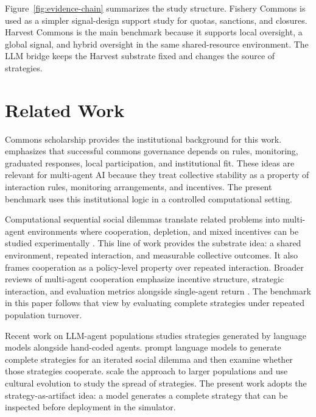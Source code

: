 \documentclass[11pt]{article}
\begin{document}
Figure~\ref{fig:evidence-chain} summarizes the study structure. Fishery Commons is used as a simpler signal-design support study for quotas, sanctions, and closures. Harvest Commons is the main benchmark because it supports local oversight, a global signal, and hybrid oversight in the same shared-resource environment. The LLM bridge keeps the Harvest substrate fixed and changes the source of strategies.

\section{Related Work}

Commons scholarship provides the institutional background for this work. \citet{ostrom1990governing} emphasizes that successful commons governance depends on rules, monitoring, graduated responses, local participation, and institutional fit. These ideas are relevant for multi-agent AI because they treat collective stability as a property of interaction rules, monitoring arrangements, and incentives. The present benchmark uses this institutional logic in a controlled computational setting.

Computational sequential social dilemmas translate related problems into multi-agent environments where cooperation, depletion, and mixed incentives can be studied experimentally \citep{leibo2017sequential, agapiou2022meltingpot, guo2025socialjax}. This line of work provides the substrate idea: a shared environment, repeated interaction, and measurable collective outcomes. It also frames cooperation as a policy-level property over repeated interaction. Broader reviews of multi-agent cooperation emphasize incentive structure, strategic interaction, and evaluation metrics alongside single-agent return \citep{du2023cooperationreview}. The benchmark in this paper follows that view by evaluating complete strategies under repeated population turnover.

Recent work on LLM-agent populations studies strategies generated by language models alongside hand-coded agents. \citet{willis2025cooperate} prompt language models to generate complete strategies for an iterated social dilemma and then examine whether those strategies cooperate. \citet{willis2026hundreds} scale the approach to larger populations and use cultural evolution to study the spread of strategies. The present work adopts the strategy-as-artifact idea: a model generates a complete strategy that can be inspected before deployment in the simulator.
\end{document}
